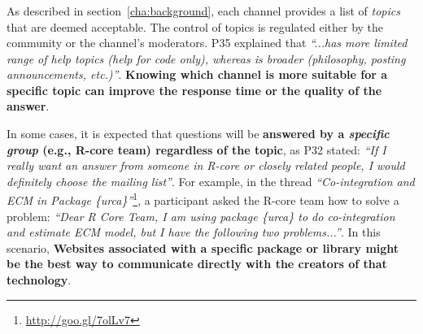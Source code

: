 \subsubsection{\reca}


    As described in section~\ref{cha:background}, each channel provides a list of \textit{topics} that are deemed acceptable.
    The control of topics is regulated either by the community or the channel's moderators.
    P35 explained that \textit{``...\SO has more limited range of help topics (help for code only), whereas \RH is broader (philosophy, posting announcements, etc.)''}.
    \textbf{Knowing which channel is more suitable for a specific topic can improve the response time or the quality of the answer}.


    In some cases, it is expected that questions will be \textbf{answered by a \textit{specific group} (e.g., R-core team) regardless of the topic}, as P32 stated: \textit{``If I really want an answer from someone in R-core or closely related people, I would definitely choose the mailing list''}.
    For example, in the \RH thread \textit{``Co-integration and ECM in Package \{urca\}''}\footnote{\url{http://goo.gl/7olLv7}}, a participant asked the R-core team how to solve a problem: \textit{``Dear R Core Team, I am using package \{urca\} to do co-integration and estimate ECM model, but I have the following two problems...''}.
    In this scenario, \textbf{Websites associated with a specific package or library might be the best way to communicate directly with the creators of that technology}.
     


